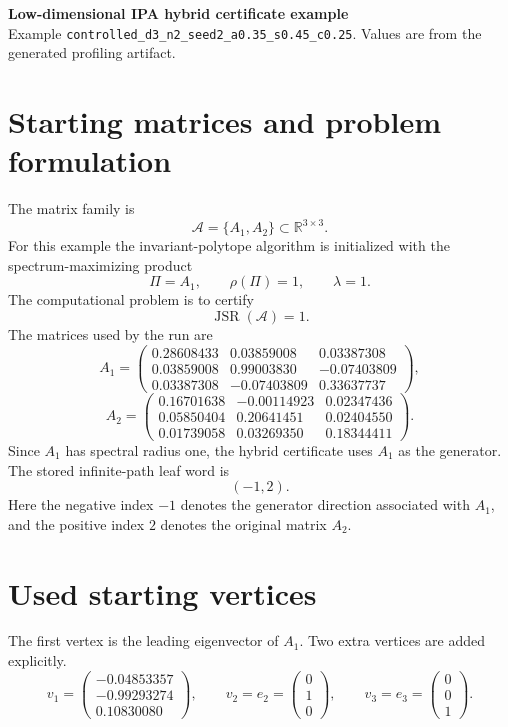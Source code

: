 \documentclass[11pt,a4paper]{scrartcl}
\DeclareMathOperator{\JSR}{JSR}
\newcommand{\matthree}[9]{%
\begin{pmatrix}
    #1 & #2 & #3\\
    #4 & #5 & #6\\
    #7 & #8 & #9
\end{pmatrix}}
\begin{document}
\begin{center}
    {\Large\bfseries Low-dimensional IPA hybrid certificate example}\\[0.25em]
    {\small Example \texttt{controlled\_d3\_n2\_seed2\_a0.35\_s0.45\_c0.25}. Values are from the generated profiling artifact.}
\end{center}

\section{Starting matrices and problem formulation}

The matrix family is
\[
    \mathcal{A}=\{A_1,A_2\}\subset \mathbb R^{3\times 3}.
\]
For this example the invariant-polytope algorithm is initialized with the spectrum-maximizing product
\[
    \Pi=A_1,\qquad \rho(\Pi)=1,\qquad \lambda=1.
\]
The computational problem is to certify
\[
    \JSR(\mathcal{A})=1.
\]
The matrices used by the run are
\[
    A_1=
    \matthree
    {0.28608433}{0.03859008}{0.03387308}
    {0.03859008}{0.99003830}{-0.07403809}
    {0.03387308}{-0.07403809}{0.33637737},
\]
\[
    A_2=
    \matthree
    {0.16701638}{-0.00114923}{0.02347436}
    {0.05850404}{0.20641451}{0.02404550}
    {0.01739058}{0.03269350}{0.18344411}.
\]
Since $A_1$ has spectral radius one, the hybrid certificate uses $A_1$ as the generator.
The stored infinite-path leaf word is
\[
    (-1,2).
\]
Here the negative index $-1$ denotes the generator direction associated with $A_1$, and the positive index $2$ denotes the original matrix $A_2$.

\section{Used starting vertices}

The first vertex is the leading eigenvector of $A_1$.
Two extra vertices are added explicitly.
\[
    v_1=
    \begin{pmatrix}
        -0.04853357\\
        -0.99293274\\
        0.10830080
    \end{pmatrix},
    \qquad
    v_2=e_2=
    \begin{pmatrix}0\\1\\0\end{pmatrix},
        \qquad
        v_3=e_3=
        \begin{pmatrix}0\\0\\1\end{pmatrix}.
        \]
\end{document}

